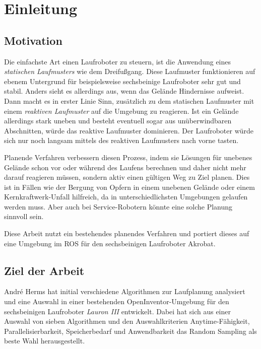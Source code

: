 \chapter{Einleitung}
\label{kap1}

\section{Motivation}

Die einfachste Art einen Laufroboter zu steuern, ist die Anwendung eines \emph{statischen Laufmusters} wie dem Dreifußgang. Diese Laufmuster funktionieren auf ebenem Untergrund für beispielsweise sechsbeinige Laufroboter sehr gut und stabil. Anders sieht es allerdings aus, wenn das Gelände Hindernisse aufweist. Dann macht es in erster Linie Sinn, zusätzlich zu dem statischen Laufmuster mit einem \emph{reaktiven Laufmuster} auf die Umgebung zu reagieren. Ist ein Gelände allerdings stark uneben und besteht eventuell sogar aus unüberwindbaren Abschnitten, würde das reaktive Laufmuster dominieren. Der Laufroboter würde sich nur noch langsam mittels des reaktiven Laufmusters nach vorne tasten.

Planende Verfahren verbessern diesen Prozess, indem sie Lösungen für unebenes Gelände schon vor oder während des Laufens berechnen und daher nicht mehr darauf reagieren müssen, sondern aktiv einen gültigen Weg zu Ziel planen. Dies ist in Fällen wie der Bergung von Opfern in einem unebenen Gelände oder einem Kernkraftwerk-Unfall hilfreich, da in unterschiedlichsten Umgebungen gelaufen werden muss. Aber auch bei Service-Robotern könnte eine solche Planung sinnvoll sein.

Diese Arbeit nutzt ein bestehendes planendes Verfahren und portiert dieses auf eine Umgebung im \ac{ROS} für den sechsbeinigen Laufroboter Akrobat.

\section{Ziel der Arbeit}

André Herms \autocite{herms2004} hat initial verschiedene Algorithmen zur Laufplanung analysiert und eine Auswahl in einer bestehenden OpenInventor-Umgebung \autocite{inventor} für den sechsbeinigen Laufroboter \emph{Lauron III} entwickelt. Dabei hat sich aus einer Auswahl von sieben Algorithmen und den Auswahlkriterien Anytime-Fähigkeit, Parallelisierbarkeit, Speicherbedarf und Anwendbarkeit das Random Sampling als beste Wahl herausgestellt.

